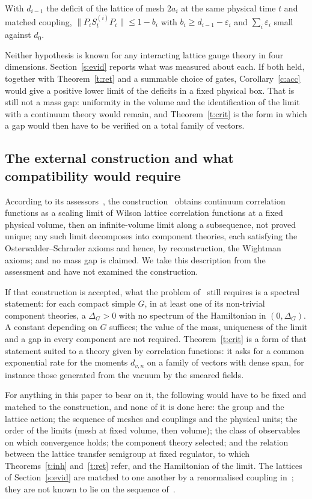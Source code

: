 \begin{hypothesis}\label{h:coarse}
With $d_{i-1}$ the deficit of the lattice of mesh $2a_i$ at the same physical time $t$ and matched coupling,
$\|P_iS^{(i)}_tP_i\|\le1-b_i$ with $b_i\ge d_{i-1}-\varepsilon_i$ and $\sum_i\varepsilon_i$ small against
$d_0$.
\end{hypothesis}

Neither hypothesis is known for any interacting lattice gauge theory in four dimensions. Section~\ref{s:evid}
reports what was measured about each. If both held, together with Theorem~\ref{t:ret} and a summable choice
of gates, Corollary~\ref{c:acc} would give a positive lower limit of the deficits in a fixed physical box. That
is still not a mass gap: uniformity in the volume and the identification of the limit with a continuum theory
would remain, and Theorem~\ref{t:crit} is the form in which a gap would then have to be verified on a total
family of vectors.

\subsection{The external construction and what compatibility would require}\label{s:ext}
According to its assessors~\cite[p.~1]{YMG}, the construction~\cite{OAI} obtains continuum correlation functions
as a scaling limit of Wilson lattice correlation functions at a fixed physical volume, then an infinite-volume
limit along a subsequence, not proved unique; any such limit decomposes into component theories, each
satisfying the Osterwalder--Schrader axioms and hence, by reconstruction, the Wightman axioms; and no mass gap
is claimed. We take this description from the assessment and have not examined the construction.

If that construction is accepted, what the problem of~\cite{JW} still requires is a spectral statement: for
each compact simple $G$, in at least one of its non-trivial component theories, a $\Delta_G>0$ with no spectrum
of the Hamiltonian in $(0,\Delta_G)$. A constant depending on $G$ suffices; the value of the mass, uniqueness of
the limit and a gap in every component are not required. Theorem~\ref{t:crit} is a form of that statement
suited to a theory given by correlation functions: it asks for a common exponential rate for the
moments $d_{v,n}$ on a family of vectors with dense span, for instance those generated from the vacuum by the
smeared fields.

For anything in this paper to bear on it, the following would have to be fixed and matched to the
construction, and none of it is done here: the group and the lattice action; the sequence of meshes and
couplings and the physical units; the order of the limits (mesh at fixed volume, then volume); the class of
observables on which convergence holds; the component theory selected; and the relation between the lattice
transfer semigroup at fixed regulator, to which Theorems~\ref{t:inh} and~\ref{t:ret} refer, and the
Hamiltonian of the limit. The lattices of Section~\ref{s:evid} are matched to one another by a renormalised
coupling in~\cite{Repo}; they are not known to lie on the sequence of~\cite{OAI}.

